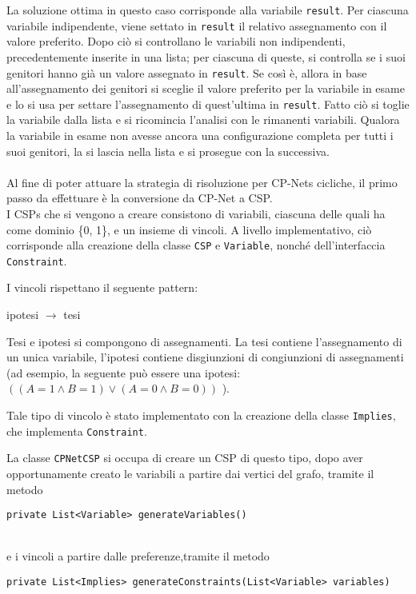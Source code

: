 La soluzione ottima in questo caso corrisponde alla variabile \texttt{result}.
Per ciascuna variabile indipendente, viene settato in \texttt{result} il relativo assegnamento con il valore preferito.
Dopo ciò si controllano le variabili non indipendenti, precedentemente inserite in una lista; per ciascuna di queste, si controlla se i suoi genitori hanno già un valore assegnato in \texttt{result}. Se così è, allora in base all'assegnamento dei genitori si sceglie il valore preferito per la variabile in esame e lo si usa per settare l'assegnamento di quest'ultima in \texttt{result}. Fatto ciò si toglie la variabile dalla lista e si ricomincia l'analisi con le rimanenti variabili. Qualora la variabile in esame non avesse ancora una configurazione completa per tutti i suoi genitori, la si lascia nella lista e si prosegue con la successiva.
\\
\\
Al fine di poter attuare la strategia di risoluzione per CP-Nets cicliche, il primo passo da effettuare è la conversione da CP-Net a CSP. 
\\
I CSPs che si vengono a creare consistono di variabili, ciascuna delle quali ha come dominio \{0, 1\}, e un insieme di vincoli.
A livello implementativo, ciò corrisponde alla creazione della classe \texttt{CSP} e \texttt{Variable}, nonché dell'interfaccia \texttt{Constraint}.
 
I vincoli rispettano il seguente pattern:
\\
\centerline{ipotesi $\rightarrow$ tesi}

Tesi e ipotesi si compongono di assegnamenti. La tesi contiene l'assegnamento di un unica variabile, l'ipotesi contiene disgiunzioni di congiunzioni di assegnamenti (ad esempio, la seguente può essere una ipotesi: $( (A=1 \land B=1) \lor (A=0 \land B=0))$ ). 

Tale tipo di vincolo è stato implementato con la creazione della classe \texttt{Implies}, che implementa \texttt{Constraint}.


La classe \texttt{CPNetCSP} si occupa di creare un CSP di questo tipo, dopo aver opportunamente creato le variabili a partire dai vertici del grafo, tramite il metodo
\\
\centerline{\texttt{private List<Variable> generateVariables()}}
\\
e i vincoli a partire dalle preferenze,tramite il metodo
\\
\centerline{\texttt{private List<Implies> generateConstraints(List<Variable> variables)}}
\\

